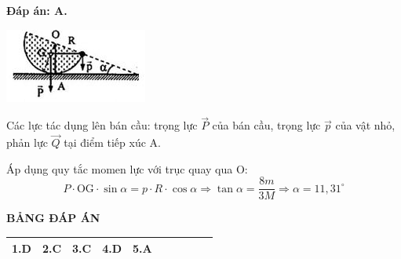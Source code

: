 \begin{enumerate}[label=\bfseries Câu \arabic*:]
	\hideall
	{	\textbf{Đáp án: A.}
		
		\begin{center}
			\includegraphics[scale=1]{../figs/VN10-2021-PH-TP021-8.png}
		\end{center}
		
		Các lực tác dụng lên bán cầu: trọng lực $\vec P$ của bán cầu, trọng lực $\vec p$ của vật nhỏ, phản lực $\vec Q$ tại điểm tiếp xúc A.
		
		Áp dụng quy tắc momen lực với trục quay qua O:
		$$P \cdot \text{OG} \cdot \sin \alpha = p \cdot R \cdot \cos \alpha \Rightarrow \tan \alpha = \dfrac{8m}{3M} \Rightarrow \alpha = 11,31^\circ$$
	}
	
	
\end{enumerate}



\hideall
{
	\begin{center}
		\textbf{BẢNG ĐÁP ÁN}
	\end{center}
	\begin{center}
		\begin{tabular}{|m{2.8em}|m{2.8em}|m{2.8em}|m{2.8em}|m{2.8em}|m{2.8em}|m{2.8em}|m{2.8em}|m{2.8em}|m{2.8em}|}
			\hline
			1.D  & 2.C  & 3.C & 4.D & 5.A  & & & & &  \\
			\hline
			
		\end{tabular}
	\end{center}
}
